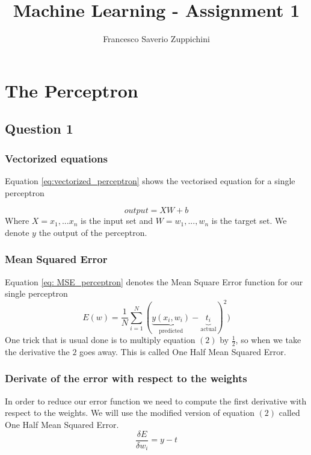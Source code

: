 \documentclass[11pt]{article}
\author{Francesco Saverio Zuppichini}
\title{Machine Learning - Assignment 1}
\begin{document}
\maketitle

\section{The Perceptron}
\subsection{Question 1}
\subsubsection{Vectorized equations}
Equation \ref{eq:vectorized_perceptron} shows the vectorised equation for a single perceptron

\begin{equation}
\label{eq:vectorized_perceptron}
output = XW + b
\end{equation}
Where $X = {x_1, ... x_n}$ is the input set and $W = {w_1, ..., w_n}$ is the target set. We denote $y$ the output of the perceptron.

\subsubsection{Mean Squared Error}
Equation \ref{eq: MSE_perceptron} denotes the Mean Square Error function for our single perceptron
\begin{equation}
\label{eq: MSE_perceptron}
	E(w) = \frac{1}{N}\sum_{i = 1}^N(\underbrace{y(x_i,w_i)}_{\text{predicted}} - \underbrace{t_i}_{\text{actual}})^2)
\end{equation}
One trick that is usual done is to multiply equation $(2)$ by $\frac{1}{2}$, so when we take the derivative the $2$ goes away. This is called One Half Mean Squared Error.

\subsubsection{Derivate of the error with respect to the weights}
In order to reduce our error function we need to compute the first derivative with respect to the weights. We will use the modified version of equation $(2)$ called One Half Mean Squared Error.
\begin{equation}
\frac{\delta E}{\delta w_i}	= y - t
\end{equation}
\end{document}
